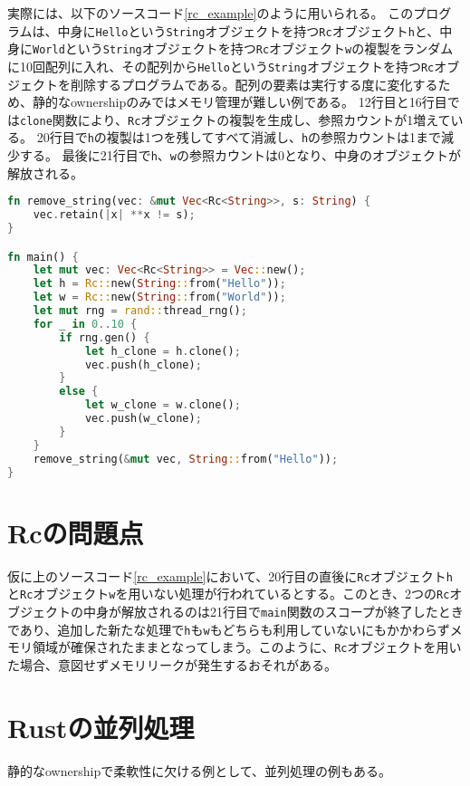 \documentclass{sumiilab-paper}
\theoremstyle{mystyle}
\numberwithin{definition}{chapter} %
\begin{document}
実際には、以下のソースコード\ref{rc_example}のように用いられる。
このプログラムは、中身に\texttt{Hello}という\texttt{String}オブジェクトを持つ\texttt{Rc}オブジェクト\texttt{h}と、中身に\texttt{World}という\texttt{String}オブジェクトを持つ\texttt{Rc}オブジェクト\texttt{w}の複製をランダムに10回配列に入れ、その配列から\texttt{Hello}という\texttt{String}オブジェクトを持つ\texttt{Rc}オブジェクトを削除するプログラムである。配列の要素は実行する度に変化するため、静的なownershipのみではメモリ管理が難しい例である。
12行目と16行目では\texttt{clone}関数により、\texttt{Rc}オブジェクトの複製を生成し、参照カウントが1増えている。
20行目で\texttt{h}の複製は1つを残してすべて消滅し、\texttt{h}の参照カウントは1まで減少する。
最後に21行目で\texttt{h}、\texttt{w}の参照カウントは0となり、中身のオブジェクトが解放される。
\begin{lstlisting}[language=Rust, caption=Rcオブジェクトの利用例, label=rc_example, captionpos=b]
fn remove_string(vec: &mut Vec<Rc<String>>, s: String) {
    vec.retain(|x| **x != s);
}

fn main() {
    let mut vec: Vec<Rc<String>> = Vec::new();
    let h = Rc::new(String::from("Hello"));
    let w = Rc::new(String::from("World"));
    let mut rng = rand::thread_rng();
    for _ in 0..10 {
        if rng.gen() {
            let h_clone = h.clone();
            vec.push(h_clone);
        }
        else {
            let w_clone = w.clone();
            vec.push(w_clone);
        }
    }
    remove_string(&mut vec, String::from("Hello"));
}
\end{lstlisting}

\section{Rcの問題点}
仮に上のソースコード\ref{rc_example}において、20行目の直後に\texttt{Rc}オブジェクト\texttt{h}と\texttt{Rc}オブジェクト\texttt{w}を用いない処理が行われているとする。このとき、2つの\texttt{Rc}オブジェクトの中身が解放されるのは21行目で\texttt{main}関数のスコープが終了したときであり、追加した新たな処理で\texttt{h}も\texttt{w}もどちらも利用していないにもかかわらずメモリ領域が確保されたままとなってしまう。このように、\texttt{Rc}オブジェクトを用いた場合、意図せずメモリリークが発生するおそれがある。

\section{Rustの並列処理}
静的なownershipで柔軟性に欠ける例として、並列処理の例もある。
\end{document}
